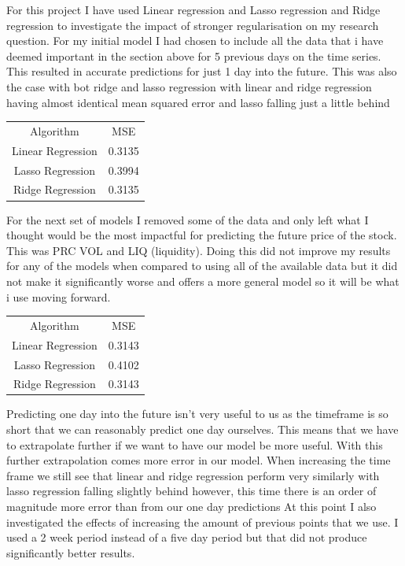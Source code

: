 \documentclass{report}
\begin{document}
For this project I have used Linear regression and Lasso regression and Ridge regression to investigate the impact of stronger regularisation on my research question.
For my initial model I had chosen to include all the data that i have deemed important in the section above for 5 previous days on the time series. This resulted in accurate predictions for just 1 day into the future. This was also the case with bot ridge and lasso regression with linear and ridge regression having almost identical mean squared error and lasso falling just a little behind

\begin{minipage} {\linewidth}
\bigskip
\centering
{}
\begin{tabular}{c c}
    Algorithm & MSE \\
    Linear Regression & 0.3135 \\
    Lasso Regression & 0.3994 \\
    Ridge Regression & 0.3135
\end{tabular}
\bigskip
\end{minipage}

For the next set of models I removed some of the data and only left what I thought would be the most impactful for predicting the future price of the stock.
This was PRC VOL and LIQ (liquidity).
Doing this did not improve my results for any of the models when compared to using all of the available data but it did not make it significantly worse and offers a more general model so it will be what i use moving forward.

\begin{minipage} {\linewidth}
\bigskip
\centering
{}
\begin{tabular}{c c}
    Algorithm & MSE \\
    Linear Regression & 0.3143 \\
    Lasso Regression & 0.4102 \\
    Ridge Regression & 0.3143
\end{tabular}
\bigskip
\end{minipage}

Predicting one day into the future isn't very useful to us as the timeframe is so short that we can reasonably predict one day ourselves. This means that we have to extrapolate further if we want to have our model be more useful.
With this further extrapolation comes more error in our model.
When increasing the time frame we still see that linear and ridge regression perform very similarly with lasso regression falling slightly behind however, this time there is an order of magnitude more error than from our one day predictions
At this point I also investigated the effects of increasing the amount of previous points that we use. I used a 2 week period instead of a five day period but that did not produce significantly better results.
\end{document}
